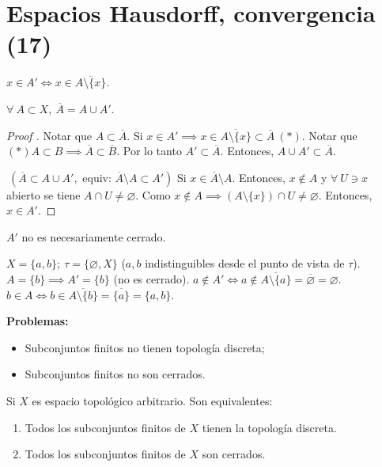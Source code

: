 \section{Espacios Hausdorff, convergencia (17)}

\begin{remark}
	$x \in A' \iff x \in \overline{A \setminus \{x\}}$. 
\end{remark}

\begin{lemma}
	$\forall \ A \subset X,\ \overline{A} = A \cup A'$.
\end{lemma}

\begin{proof}[Proof ]
	\fbox{$\supset$} Notar que $A \subset \overline{A}$. Si $x \in A' \implies x \in \overline{A \setminus \{x\}} \subset \overline{A} \ (*)$. Notar que $(*) A \subset B \implies \overline{A} \subset \overline{B}$. Por lo tanto $A' \subset \overline{A}$. Entonces, $A \cup A' \subset \overline{A}$.

	\noindent \fbox{$\subset$} $\ (\overline{A} \subset A \cup A', \text{ equiv: } \overline{A}\setminus A \subset A')$ Si $x \in \overline{A} \setminus A$. Entonces, $x \not\in A$ y $\forall \ U \ni x$ abierto se tiene $A \cap U \neq \varnothing$. Como $x \not\in A \implies (A \setminus \{x\}) \cap U \neq \varnothing$. Entonces, $x \in A'$.  
\end{proof}

\begin{remark}
	$A'$ no es necesariamente cerrado.
\end{remark}

\begin{eg}
	$X = \{ a,b \};\ \tau = \{ \varnothing, X \}$ ($a,b$ indistinguibles desde el punto de vista de $\tau$). $A = \{ b \} \implies A' = \{b\} $ (no es cerrado). $a \not\in A' \iff a \not\in \overline{A \setminus \{a\} } = \overline{\varnothing} = \varnothing$. $b \in A \iff b \in \overline{A \setminus \{b\} } = \overline{\{a\}} = \{a,b\}$.      
\end{eg}

\noindent \textbf{Problemas:}
\begin{itemize}
	\item Subconjuntos finitos no tienen topología discreta;

	\item Subconjuntos finitos no son cerrados.
\end{itemize}

\begin{lemma}
	Si $X$ es espacio topológico arbitrario. Son equivalentes:
	\begin{enumerate}
		\item Todos los subconjuntos finitos de $X$ tienen la topología discreta.

		\item Todos los subconjuntos finitos de $X$ son cerrados.
	\end{enumerate}
\end{lemma}

